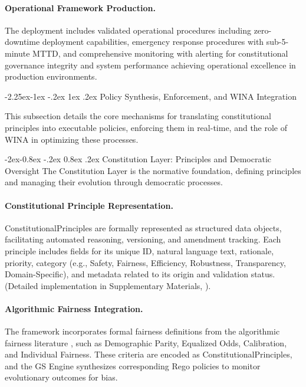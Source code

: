 \documentclass[manuscript,screen,9pt]{acmart}
\makeatletter
\renewcommand\subsection{\@startsection{subsection}{2}{\z@}%
  {-2.25ex\@plus -1ex \@minus -.2ex}%
  {1ex \@plus .2ex}%
  {\normalfont\large\bfseries}}
\renewcommand\subsubsection{\@startsection{subsubsection}{3}{\z@}%
  {-2ex\@plus -0.8ex \@minus -.2ex}%
  {0.8ex \@plus .2ex}%
  {\normalfont\normalsize\bfseries}}
\makeatother
\begin{document}
\paragraph{Operational Framework Production.} The deployment includes validated operational procedures including zero-downtime deployment capabilities, emergency response procedures with sub-5-minute MTTD, and comprehensive monitoring with alerting for constitutional governance integrity and system performance achieving operational excellence in production environments.

\subsection{Policy Synthesis, Enforcement, and WINA Integration}
\label{subsec:policy_synthesis_enforcement}

This subsection details the core mechanisms for translating constitutional principles into executable policies, enforcing them in real-time, and the role of WINA in optimizing these processes.

\subsubsection{Constitution Layer: Principles and Democratic Oversight}
\label{subsubsec:constitution_layer}
The Constitution Layer is the normative foundation, defining principles and managing their evolution through democratic processes.

\paragraph{Constitutional Principle Representation.} ConstitutionalPrinciples are formally represented as structured data objects, facilitating automated reasoning, versioning, and amendment tracking. Each principle includes fields for its unique ID, natural language text, rationale, priority, category (e.g., Safety, Fairness, Efficiency, Robustness, Transparency, Domain-Specific), and metadata related to its origin and validation status. (Detailed implementation in Supplementary Materials, ).

\paragraph{Algorithmic Fairness Integration.} The framework incorporates formal fairness definitions from the algorithmic fairness literature \cite{Barocas2023FairnessML, Hardt2016EqualityOpportunity, Chouldechova2017FairPrediction, Dwork2012DifferentialPrivacy}, such as Demographic Parity, Equalized Odds, Calibration, and Individual Fairness. These criteria are encoded as ConstitutionalPrinciples, and the GS Engine synthesizes corresponding Rego policies to monitor evolutionary outcomes for bias.
\end{document}
